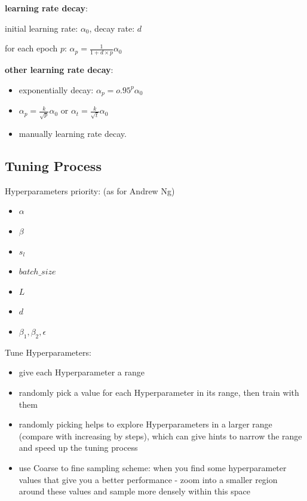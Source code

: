 \documentclass{article}
\begin{document}
\noindent \textbf{learning rate decay}:

\noindent initial learning rate: \(\alpha_{0}\), decay rate: \(d\)

\noindent for each epoch \(p\): \(\alpha_{p} = \frac{1}{1 + d \times p} \alpha_{0}\)

\bigskip

\noindent \textbf{other learning rate decay}:

\begin{itemize}
    \item exponentially decay: \(\alpha_{p} = o.95^{p} \alpha_{0}\)
    \item \(\alpha_{p} = \frac{k}{\sqrt{p}} \alpha_{0}\) or \(\alpha_{t} = \frac{k}{\sqrt{t}} \alpha_{0}\)
    \item manually learning rate decay.
\end{itemize}

\subsection{Tuning Process}

\noindent Hyperparameters priority: (as for Andrew Ng)

\begin{itemize}
    \item \(\alpha\)
    \item \(\beta\)
    \item \(s_{l}\)
    \item \(batch\_size\)
    \item \(L\)
    \item \(d\)
    \item \(\beta_{1}, \beta_{2}, \epsilon\)
\end{itemize}

\noindent Tune Hyperparameters:

\begin{itemize}
    \item give each Hyperparameter a range
    \item randomly pick a value for each Hyperparameter in its range, then train with them
    \item randomly picking helps to explore Hyperparameters in a larger range (compare with increasing by steps), which can give hints to narrow the range and speed up the tuning process
    \item use Coarse to fine sampling scheme: when you find some hyperparameter values that give you a better performance - zoom into a smaller region around these values and sample more densely within this space
\end{itemize}
\end{document}
